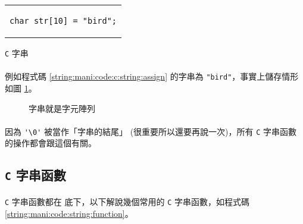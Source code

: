 \documentclass[12pt,a4paper,oneside]{report}
\begin{document}
\begin{CJK}{UTF8}{bkai}
\begin{code}[h!]
  \centering
  \begin{tabular}{c}
  \begin{lstlisting}
char str[10] = "bird";
  \end{lstlisting}
  \end{tabular}
  \caption{\texttt{C} 字串}
  \label{string:mani:code:c:string:assign}
\end{code}

\paragraph{}例如程式碼 \ref{string:mani:code:c:string:assign} 的字串為 \lstinline!"bird"!，事實上儲存情形如圖 \ref{string:mani:fig:char:array}。

\begin{figure}[h!]
  \centering
  \caption{字串就是字元陣列}
  \label{string:mani:fig:char:array}
\end{figure}

\paragraph{}因為 \lstinline!'\0'! 被當作「字串的結尾」 (很重要所以還要再說一次)，所有 \texttt{C} 字串函數的操作都會跟這個有關。

\subsection{\texttt{C} 字串函數}

\paragraph{}\texttt{C} 字串函數都在  底下，以下解說幾個常用的 \texttt{C} 字串函數，如程式碼 \ref{string:mani:code:string:function}。


\end{CJK}
\end{document}
